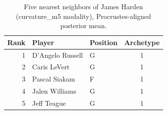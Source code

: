 \begin{table}[htbp]
  \centering\small
  \begin{tabular}{rllc}
    \toprule
    Rank & Player & Position & Archetype \\
    \midrule
    1 & D'Angelo Russell & G & 1 \\
    2 & Caris LeVert & G & 1 \\
    3 & Pascal Siakam & F & 1 \\
    4 & Jalen Williams & G & 1 \\
    5 & Jeff Teague & G & 1 \\
    \bottomrule
  \end{tabular}
  \caption{Five nearest neighbors of James Harden (curvature_m5 modality), Procrustes-aligned posterior mean.}
  \label{tab:James_Harden_neighbors_curvature_m5}
\end{table}

